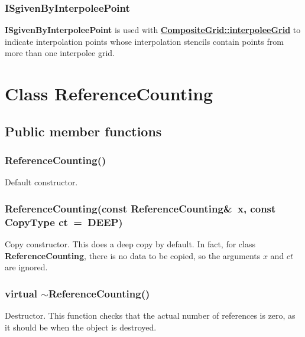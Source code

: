 \documentclass{article}
\begin{document}
  \subsubsection{ISgivenByInterpoleePoint}
  \label{CompositeGrid::ISgivenByInterpoleePoint}
    \textbf{ISgivenByInterpoleePoint} is used with
    {\bf{}\hyperref{interpoleeGrid$[k]$}{interpoleeGrid$[k]$ \rm(\S}{)}{CompositeGrid::interpoleeGrid}}
    to indicate interpolation points whose interpolation stencils contain points from more than one interpolee grid.

\appendix %

\section{Class ReferenceCounting}
\label{ReferenceCounting}

\subsection{Public member functions}
\label{ReferenceCounting::PublicMemberFunctions}

  \subsubsection{ReferenceCounting()}
  \label{ReferenceCounting::ReferenceCounting()}
    Default constructor.

  \subsubsection{ReferenceCounting(const ReferenceCounting\&~x, const CopyType ct~=~DEEP)}
  \label{ReferenceCounting::ReferenceCounting(x,ct)}
    Copy constructor.  This does a deep copy by default.  In fact, for class \textbf{ReferenceCounting},
    there is no data to be copied, so the arguments $x$ and $ct$ are ignored.

  \subsubsection{virtual $\sim$ReferenceCounting()}
  \label{ReferenceCounting::tilde_ReferenceCounting()}
    Destructor.  This function checks that the actual number of references is zero, as it should be when the object is destroyed.
\end{document}
